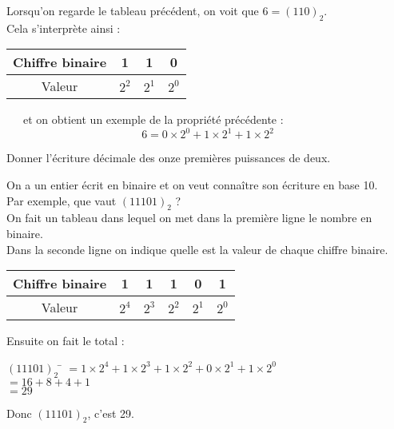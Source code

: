 \documentclass[a4paper,12pt,french]{book}
\begin{document}
\begin{exemple}
Lorsqu'on regarde le tableau précédent, on voit que $6=(110)_2$.\\Cela s'interprète ainsi :\\

\begin{tabular}{|c|c|c|c|}
	\hline 
	Chiffre binaire & 1 & 1 & 0 \\ 
	\hline 
	Valeur & $2^2$ & $2^1$ & $2^0$ \\ 
	\hline 
\end{tabular}\ \ \ et on obtient un exemple de la propriété précédente : $$6=0\times 2^0+1\times 2^1+1\times 2^2$$
\end{exemple}

\begin{exercice}
	Donner l'écriture décimale des onze premières puissances de deux.
\end{exercice}

\begin{methode}
On a un entier écrit en binaire et on veut connaître son écriture en base 10.\\
Par exemple, que vaut $(11101)_2$ ?\\
On fait un tableau dans lequel on met dans la première ligne le nombre en binaire.\\ 
Dans la seconde ligne on indique quelle est la valeur de chaque chiffre binaire.
\begin{center}
	\begin{tabular}{|c|c|c|c|c|c|}
		\hline 
		Chiffre binaire & 1 & 1 & 1 & 0 & 1 \\ 
		\hline 
		Valeur & $2^4$ & $2^3$ & $2^2$ & $2^1$ & $2^0$ \\ 
		\hline 
	\end{tabular}
\end{center}
Ensuite on fait le total :
\begin{tabbing}
		$(11101)_2$	\= 	$=1\times 2^4+1\times 2^3+1\times 2^2+0\times 2^1+1\times 2^0$	\\
			\>	$=16+8+4+1$	\\	
			\>	$=29$	
	\end{tabbing}
Donc $(11101)_2$, c'est 29.
\end{methode}
\end{document}
